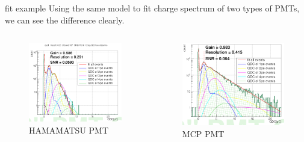 \documentclass[11pt,compress,xcolor=x11names,UTF8]{beamer}
\begin{document}
\begin{frame}{fit example}
	Using the same model to fit charge spectrum of two types of PMTs, we can see the difference clearly.
\begin{columns}
\begin{column}{.49\textwidth}
\begin{figure}[!h]
\centering
\includegraphics[width=.9\textwidth]{figure/hamfit.png} %
\caption{HAMAMATSU PMT}
\end{figure}
\end{column}
\begin{column}{.49\textwidth}
\begin{figure}[!h]
\centering
\includegraphics[width=.9\textwidth]{figure/mcpfit.png} %
\caption{MCP PMT}
\end{figure}
\end{column}
\end{columns}
\end{frame}
\end{document}
